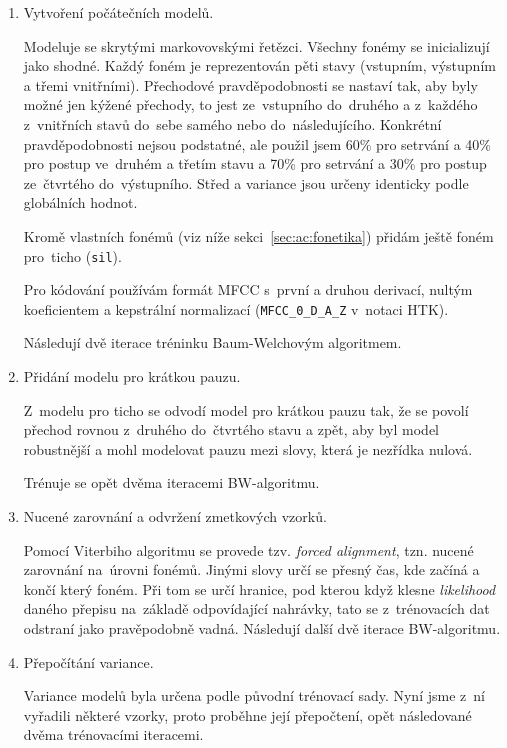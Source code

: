 \begin{enumerate}

\item{Vytvoření počátečních modelů.}

Modeluje se skrytými markovovskými řetězci. Všechny fonémy se inicializují jako
shodné. Každý foném je reprezentován pěti stavy (vstupním, výstupním a třemi
vnitřními). Přechodové pravděpodobnosti se nastaví tak, aby byly možné jen
kýžené přechody, to jest ze~vstupního do~druhého a z~každého z~vnitřních stavů
do~sebe samého nebo do~následujícího. Konkrétní pravděpodobnosti nejsou
podstatné, ale použil jsem 60\% pro setrvání a 40\% pro postup ve~druhém a
třetím stavu a 70\% pro setrvání a 30\% pro postup ze~čtvrtého do~výstupního.
Střed a variance jsou určeny identicky podle globálních hodnot.

Kromě vlastních fonémů (viz níže sekci~\ref{sec:ac:fonetika}) přidám ještě foném
pro~ticho (\texttt{sil}).

Pro kódování používám formát MFCC s~první a druhou derivací, nultým koeficientem
a kepstrální normalizací (\texttt{MFCC\_0\_D\_A\_Z} v~notaci HTK).

Následují dvě iterace tréninku Baum-Welchovým algoritmem\cite{welch2003hidden}.

\item{Přidání modelu pro krátkou pauzu.}

Z~modelu pro ticho se odvodí model pro krátkou pauzu tak, že se povolí přechod
rovnou z~druhého do~čtvrtého stavu a zpět, aby byl model robustnější a mohl
modelovat pauzu mezi slovy, která je nezřídka nulová.

Trénuje se opět dvěma iteracemi BW-algoritmu.

\item{Nucené zarovnání a odvržení zmetkových vzorků.}

Pomocí Viterbiho algoritmu\cite{forney1973viterbi} se provede tzv.
\textit{forced alignment}, tzn. nucené zarovnání na~úrovni fonémů. Jinými slovy
určí se přesný čas, kde začíná a končí který foném. Při tom se určí hranice, pod
kterou když klesne \textit{likelihood} daného přepisu na~základě odpovídající
nahrávky, tato se z~trénovacích dat odstraní jako pravěpodobně vadná. Následují
další dvě iterace BW-algoritmu.

\item{Přepočítání variance.}

Variance modelů byla určena podle původní trénovací sady. Nyní jsme z~ní
vyřadili některé vzorky, proto proběhne její přepočtení, opět následované dvěma
trénovacími iteracemi.


\end{enumerate}
